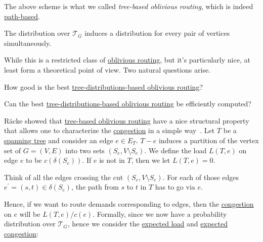 \begin{notation}\label{not:tree-based-oblivious-routing}
	The above scheme is what we called \emph{tree-based oblivious routing}, which is indeed \hyperref[def:path-based-oblivious-routing]{path-based}.
\end{notation}

\begin{note}
	The distribution over \(\mathcal{T} _G\) induces a distribution for every pair of vertices simultaneously.
\end{note}

While this is a restricted class of \hyperref[def:oblivious-routing-scheme]{oblivious routing}, but it's particularly nice, at least form a theoretical point of view. Two natural questions arise.

\begin{problem*}
	How good is the best \hyperref[not:tree-based-oblivious-routing]{tree-distributions-based oblivious routing}?
\end{problem*}

\begin{problem*}
	Can the best \hyperref[not:tree-based-oblivious-routing]{tree-distributions-based oblivious routing} be efficiently computed?
\end{problem*}

Räcke showed that \hyperref[not:tree-based-oblivious-routing]{tree-based oblivious routing} have a nice structural property that allows one to characterize the \hyperref[def:congestion-of-oblivious-routing]{congestion} in a simple way~\cite{racke2008optimal}. Let \(T\) be a \hyperref[def:spanning-tree]{spanning tree} and consider an edge \(e \in E_T\). \(T - e\) induces a partition of the vertex set of \(G = (V, E)\) into two sets \((S_e, V\setminus S_e)\). We define the load \(L(T, e)\) on edge \(e\) to be \(c(\delta (S_e))\). If \(e\) is not in \(T\), then we let \(L(T, e) = 0\).

\begin{intuition}
	Think of all the edges crossing the cut \((S_e, V \setminus S_e)\). For each of those edges \(e^{\prime} = (s, t) \in \delta (S_e)\), the path from \(s\) to \(t\) in \(T\) has to go via \(e\).
\end{intuition}

Hence, if we want to route demands corresponding to edges, then the \hyperref[def:congestion-of-oblivious-routing]{congestion} on \(e\) will be \(L(T, e) / c(e)\). Formally, since we now have a probability distribution over \(\mathcal{T} _G\), hence we consider the \hyperref[def:expected-load]{expected load} and \hyperref[def:expected-congestion]{expected congestion}:

